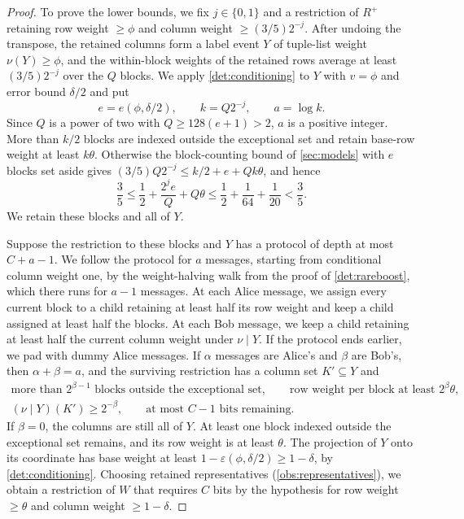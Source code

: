 \documentclass[11pt,letterpaper]{article} \usepackage[utf8]{inputenc}
\theoremstyle{plain} \newtheorem{theorem}{Theorem}[section]
\theoremstyle{definition} \newaliascnt{definition}{theorem}
\begin{document}
\begin{proof}
To prove the lower bounds, we fix $j\in\{0,1\}$ and a restriction of $R^+$ retaining row weight
$\ge\phi$ and column weight $\ge(3/5)2^{-j}$. After undoing the transpose, the retained
columns form a label event $Y$ of tuple-list weight $\nu(Y)\ge\phi$, and the within-block
weights of the retained rows average at least $(3/5)2^{-j}$ over the $Q$ blocks. We apply
\cref{det:conditioning} to $Y$ with $v=\phi$ and error bound $\delta/2$ and put
\[
e=e(\phi,\delta/2),\qquad k=Q2^{-j},\qquad a=\log k.
\]
Since $Q$ is a power of two with $Q\ge128(e+1)>2$, $a$ is a positive integer. More than $k/2$ blocks
are indexed outside the exceptional set and retain base-row weight
at least $k\theta$. Otherwise the
block-counting bound of \cref{sec:models} with $e$ blocks set aside gives
$(3/5)Q2^{-j}\le k/2+e+Qk\theta$, and hence
\[
\frac35\le\frac12+\frac{2^je}{Q}+Q\theta
\le\frac12+\frac1{64}+\frac1{20}<\frac35.
\]
We retain these blocks and all of $Y$.

Suppose the restriction to these blocks and $Y$ has a protocol of depth at most $C+a-1$.
We follow the protocol for $a$
messages, starting from conditional column weight one, by the weight-halving
walk from the proof of \cref{det:rareboost}, which there runs for $a-1$ messages. At each Alice
message, we assign every current block to a child retaining at least half its row
weight and keep a child assigned at least half the blocks. At each Bob message, we
keep a child retaining at least half the current column weight under $\nu\mid Y$.
If the protocol ends earlier, we pad with dummy Alice messages. If $\alpha$ messages are Alice's and $\beta$
are Bob's, then $\alpha+\beta=a$, and the surviving restriction has a column set $K'\subseteq Y$ and
\[
\begin{gathered}
\text{more than }2^{\beta-1}\text{ blocks outside the exceptional set},\qquad
\text{row weight per block at least }2^\beta\theta,\\
(\nu\mid Y)(K')\ge2^{-\beta},\qquad
\text{at most }C-1\text{ bits remaining}.
\end{gathered}
\]
If $\beta=0$, the columns are still all of $Y$. At least one block indexed
outside the exceptional set remains, and its row weight is at least $\theta$. The projection of $Y$ onto its coordinate has base
weight at least $1-\varepsilon(\phi,\delta/2)\ge1-\delta$, by
\cref{det:conditioning}. Choosing retained representatives
(\cref{obs:representatives}), we obtain a restriction of $W$ that requires $C$ bits by the hypothesis for row weight $\ge\theta$ and column weight $\ge1-\delta$.


\end{proof}
\end{document}
